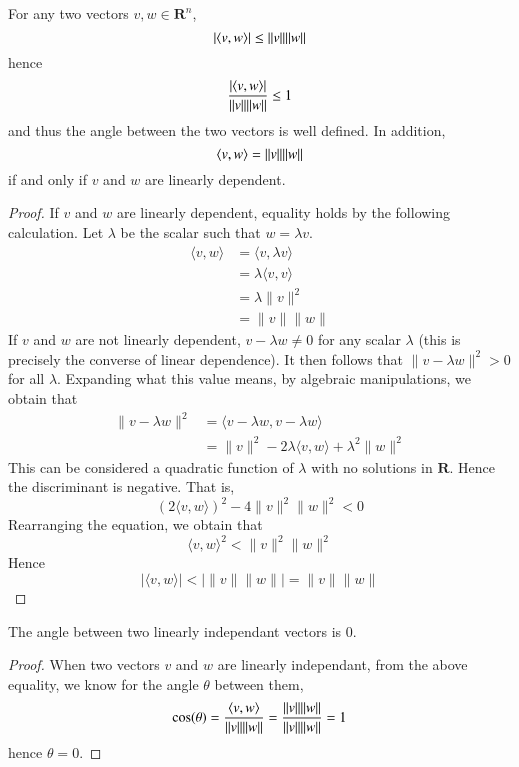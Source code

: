 \begin{theorem}
  For any two vectors $v,w \in \mathbf{R}^n$,
  \[ |\langle v, w\rangle| \leq \|v\|\|w\| \]
  hence
  \[ \frac{|\langle v, w\rangle|}{\|v\|\|w\|} \leq 1 \]
  and thus the angle between the two vectors is well defined. In addition,
  \[ \langle v, w\rangle = \|v\|\|w\| \]
  if and only if $v$ and $w$ are linearly dependent.
\end{theorem}
\begin{proof}
  If $v$ and $w$ are linearly dependent, equality holds by the following calculation. Let $\lambda$ be the scalar such that $w = \lambda v$.
  \begin{align*}
    \langle v, w \rangle &= \langle v, \lambda v \rangle\\
                         &= \lambda \langle v, v \rangle\\
                         &= \lambda \| v \|^2\\
                         &= \| v \| \| w \|
  \end{align*}
  If $v$ and $w$ are not linearly dependent, $v - \lambda w \neq 0$ for any scalar $\lambda$ (this is precisely the converse of linear dependence). It then follows that $\| v - \lambda w \|^2 > 0$ for all $\lambda$. Expanding what this value means, by algebraic manipulations, we obtain that
  \begin{align*}
    \| v - \lambda w \|^2 &= \langle v - \lambda w, v - \lambda w \rangle\\
                          &= \|v\|^2 - 2 \lambda \langle v, w \rangle + \lambda^2 \| w \|^2
  \end{align*}
  This can be considered a quadratic function of $\lambda$ with no solutions in $\mathbf{R}$. Hence the discriminant is negative. That is,
  \[ (2 \langle v, w \rangle)^2 - 4 \|v\|^2 \|w\|^2 < 0 \]
  Rearranging the equation, we obtain that
  \[ \langle v, w \rangle^2 < \|v\|^2\|w\|^2 \]
  Hence
  \[ |\langle v, w \rangle| <|\|v\|\|w\|| = \|v\|\|w\| \]
\end{proof}

\begin{corollary}
  The angle between two linearly independant vectors is 0.
\end{corollary}
\begin{proof}
  When two vectors $v$ and $w$ are linearly independant, from the above equality, we know for the angle $\theta$ between them,
  \[\cos(\theta) = \frac{\langle v, w\rangle}{\|v\|\|w\|} = \frac{\|v\|\|w\|}{\|v\|\|w\|} = 1\]
  hence $\theta = 0$.
\end{proof}

